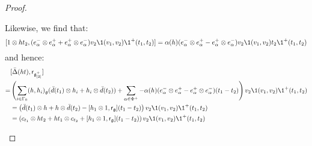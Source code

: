 \begin{proof}
\begin{enumerate}
\begin{enumerate}
                            Likewise, we find that:
                                $$[1 \tensor h t_2, (e_{\alpha}^- \tensor e_{\alpha}^+ + e_{\alpha}^+ \tensor e_{\alpha}^-) v_2\1(v_1, v_2) \1^+(t_1, t_2)] = \alpha(h) ( e_{\alpha}^- \tensor e_{\alpha}^+ - e_{\alpha}^+ \tensor e_{\alpha}^- ) v_2 \1(v_1, v_2) t_2 \1^+(t_1, t_2)$$
                            and hence:
                                $$
                                    \begin{aligned}
                                        & [\bar{\Delta}(ht), \sfr_{\g_{[2]}^+}]
                                        \\
                                        = & \left( \sum_{i \in \Gamma_0} (h, h_i)_{\g} ( \bar{d}(t_1) \tensor h_i + h_i \tensor \bar{d}(t_2) ) + \sum_{\alpha \in \Phi^+} -\alpha(h) ( e_{\alpha}^- \tensor e_{\alpha}^+ - e_{\alpha}^+ \tensor e_{\alpha}^- )(t_1 - t_2) \right) v_2 \1(v_1, v_2) \1^+(t_1, t_2)
                                        \\
                                        & = \left( \bar{d}(t_1) \tensor h + h \tensor \bar{d}(t_2) - [h_1 \tensor 1, \sfr_{\g}] (t_1 - t_2) \right) v_2 \1(v_1, v_2) \1^+(t_1, t_2)
                                        \\
                                        & = \left( c_{t_1} \tensor ht_2 + ht_1 \tensor c_{t_2} + [h_1 \tensor 1, \sfr_{\g}] (t_1 - t_2) \right) v_2 \1(v_1, v_2) \1^+(t_1, t_2)
                                    \end{aligned}
                                $$
                                

\end{enumerate}
\end{enumerate}
\end{proof}

